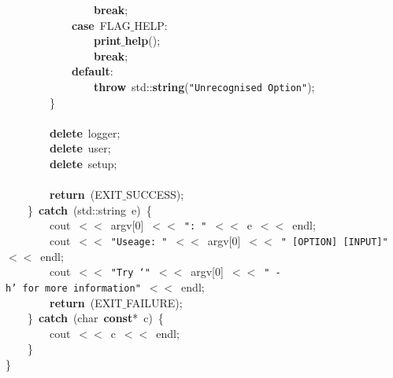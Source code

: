 \mbox{}\ \ \ \ \ \ \ \ \ \ \ \ \ \ \ \ \textbf{break}; \\
\mbox{}\ \ \ \ \ \ \ \ \ \ \ \ \textbf{case}\ FLAG$\_$HELP: \\
\mbox{}\ \ \ \ \ \ \ \ \ \ \ \ \ \ \ \ \textbf{print$\_$help}(); \\
\mbox{}\ \ \ \ \ \ \ \ \ \ \ \ \ \ \ \ \textbf{break}; \\
\mbox{}\ \ \ \ \ \ \ \ \ \ \ \ \textbf{default}: \\
\mbox{}\ \ \ \ \ \ \ \ \ \ \ \ \ \ \ \ \textbf{throw}\ std::\textbf{string}(\texttt{"{}Unrecognised\ Option"{}}); \\
\mbox{}\ \ \ \ \ \ \ \ \} \\
\mbox{} \\
\mbox{}\ \ \ \ \ \ \ \ \textbf{delete}\ logger; \\
\mbox{}\ \ \ \ \ \ \ \ \textbf{delete}\ user; \\
\mbox{}\ \ \ \ \ \ \ \ \textbf{delete}\ setup; \\
\mbox{} \\
\mbox{}\ \ \ \ \ \ \ \ \textbf{return}\ (EXIT$\_$SUCCESS); \\
\mbox{}\ \ \ \ \}\ \textbf{catch}\ (std::string\ e)\ \{ \\
\mbox{}\ \ \ \ \ \ \ \ cout\ $<$$<$\ argv[0]\ $<$$<$\ \texttt{"{}:\ "{}}\ $<$$<$\ e\ $<$$<$\ endl; \\
\mbox{}\ \ \ \ \ \ \ \ cout\ $<$$<$\ \texttt{"{}Useage:\ "{}}\ $<$$<$\ argv[0]\ $<$$<$\ \texttt{"{}\ [OPTION]\ [INPUT]"{}}\ $<$$<$\ endl; \\
\mbox{}\ \ \ \ \ \ \ \ cout\ $<$$<$\ \texttt{"{}Try\ `"{}}\ $<$$<$\ argv[0]\ $<$$<$\ \texttt{"{}\ -h'\ for\ more\ information"{}}\ $<$$<$\ endl; \\
\mbox{}\ \ \ \ \ \ \ \ \textbf{return}\ (EXIT$\_$FAILURE); \\
\mbox{}\ \ \ \ \}\ \textbf{catch}\ (char\ \textbf{const}*\ c)\ \{ \\
\mbox{}\ \ \ \ \ \ \ \ cout\ $<$$<$\ c\ $<$$<$\ endl; \\
\mbox{}\ \ \ \ \} \\
\mbox{}\} \\

\clearpage
\normalsize
\rmfamily
